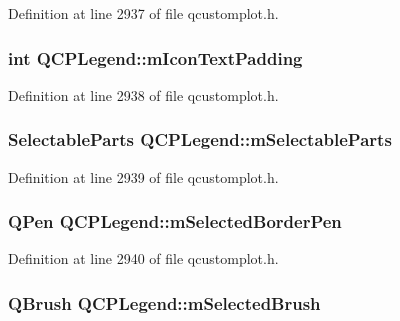 Definition at line 2937 of file qcustomplot.\-h.

\hypertarget{class_q_c_p_legend_a8abf8843864ee9afc3f54f906c062240}{
\subsubsection[{m\-Icon\-Text\-Padding}]{\setlength{\rightskip}{0pt plus 5cm}int Q\-C\-P\-Legend\-::m\-Icon\-Text\-Padding\hspace{0.3cm}{\ttfamily [protected]}}}\label{class_q_c_p_legend_a8abf8843864ee9afc3f54f906c062240}


Definition at line 2938 of file qcustomplot.\-h.

\hypertarget{class_q_c_p_legend_a179b4d5c1bea723b76e402ff48f0d7fb}{
\subsubsection[{m\-Selectable\-Parts}]{\setlength{\rightskip}{0pt plus 5cm}Selectable\-Parts Q\-C\-P\-Legend\-::m\-Selectable\-Parts\hspace{0.3cm}{\ttfamily [protected]}}}\label{class_q_c_p_legend_a179b4d5c1bea723b76e402ff48f0d7fb}


Definition at line 2939 of file qcustomplot.\-h.

\hypertarget{class_q_c_p_legend_a62906c996906ae23e9f724b6ac1f7334}{
\subsubsection[{m\-Selected\-Border\-Pen}]{\setlength{\rightskip}{0pt plus 5cm}Q\-Pen Q\-C\-P\-Legend\-::m\-Selected\-Border\-Pen\hspace{0.3cm}{\ttfamily [protected]}}}\label{class_q_c_p_legend_a62906c996906ae23e9f724b6ac1f7334}


Definition at line 2940 of file qcustomplot.\-h.

\hypertarget{class_q_c_p_legend_ab3c7567c86d4784b1e48f76a84b3a1e2}{
\subsubsection[{m\-Selected\-Brush}]{\setlength{\rightskip}{0pt plus 5cm}Q\-Brush Q\-C\-P\-Legend\-::m\-Selected\-Brush\hspace{0.3cm}{\ttfamily [protected]}}}\label{class_q_c_p_legend_ab3c7567c86d4784b1e48f76a84b3a1e2}



